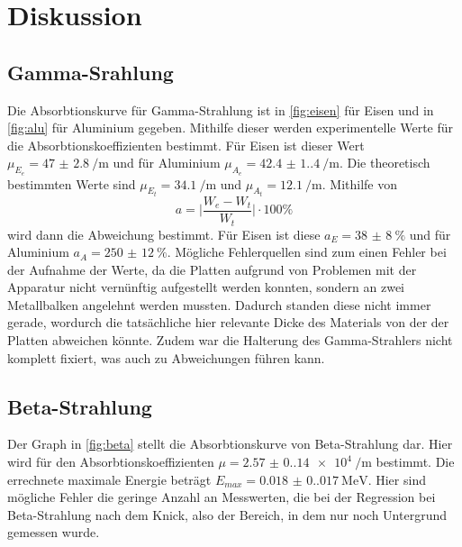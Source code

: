 \section{Diskussion}
\label{sec:Diskussion}
\subsection{Gamma-Srahlung}
Die Absorbtionskurve für Gamma-Strahlung ist in \ref{fig:eisen} für Eisen und in \ref{fig:alu} für Aluminium gegeben.
Mithilfe dieser werden experimentelle Werte für die Absorbtionskoeffizienten bestimmt.
Für Eisen ist dieser Wert $\mu_{E_e}=\qty{47(2.8)}{\per\meter}$ und für Aluminium $\mu_{A_e}=\qty{42.4(1.4)}{\per\meter}$.
Die theoretisch bestimmten Werte sind $\mu_{E_t}=\qty{34.1}{\per\meter}$ und $\mu_{A_t}=\qty{12.1}{\per\meter}$.
Mithilfe von
\begin{equation}
    a=\biggl|\frac{W_e-W_t}{W_t}\biggr| \cdot 100\unit{\percent}
    \label{eqn:Abweichung}
\end{equation}
wird dann die Abweichung bestimmt.
Für Eisen ist diese $a_E=\qty{38(8)}{\percent}$ und für Aluminium $a_A=\qty{250(12)}{\percent}$. 
Mögliche Fehlerquellen sind zum einen Fehler bei der Aufnahme der Werte, da die Platten aufgrund von Problemen mit der 
Apparatur nicht vernünftig aufgestellt werden konnten, sondern an zwei Metallbalken angelehnt werden mussten.
Dadurch standen diese nicht immer gerade, wordurch die tatsächliche hier relevante Dicke des Materials von der der
 Platten abweichen könnte.
Zudem war die Halterung des Gamma-Strahlers nicht komplett fixiert, was auch zu Abweichungen führen kann.

\subsection{Beta-Strahlung}
Der Graph in \ref{fig:beta} stellt die Absorbtionskurve von Beta-Strahlung dar.
Hier wird für den Absorbtionskoeffizienten $\mu=\qty{2.57(0.14)e4}{\per\meter}$ bestimmt.
Die errechnete maximale Energie beträgt $E_{max}=\qty{0.018(0.017)}{\mega\electronvolt}$.
Hier sind mögliche Fehler die geringe Anzahl an Messwerten, die bei der Regression bei Beta-Strahlung nach dem Knick,
also der Bereich, in dem nur noch Untergrund gemessen wurde.